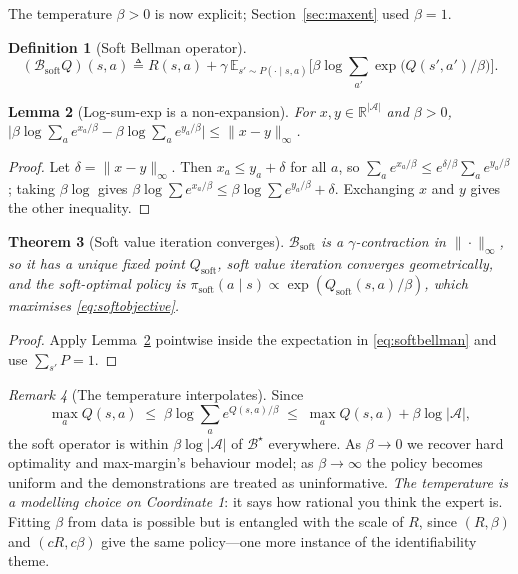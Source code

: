 \documentclass[11pt]{article}
\theoremstyle{plain}
\newtheorem{theorem}{Theorem}[section]
\newtheorem{lemma}[theorem]{Lemma}
\theoremstyle{definition}
\newtheorem{definition}[theorem]{Definition}
\theoremstyle{remark}
\newtheorem{remark}[theorem]{Remark}
\newcommand{\A}{\mathcal{A}}
\newcommand{\E}{\mathbb{E}}
\newcommand{\R}{\mathbb{R}}
\newcommand{\soft}{\mathrm{soft}}
\begin{document}
The temperature $\beta>0$ is now explicit; Section~\ref{sec:maxent} used
$\beta=1$.

\begin{definition}[Soft Bellman operator]
\begin{equation}
(\mathcal{B}_\soft Q)(s,a) \triangleq R(s,a) + \gamma\,\E_{s'\sim P(\cdot\mid
s,a)}\Big[\beta\log\sum_{a'}\exp\big(Q(s',a')/\beta\big)\Big].
\label{eq:softbellman}
\end{equation}
\end{definition}

\begin{lemma}[Log-sum-exp is a non-expansion]\label{lem:lse}
For $x,y\in\R^{|\A|}$ and $\beta>0$, $\big|\beta\log\sum_a e^{x_a/\beta} -
\beta\log\sum_a e^{y_a/\beta}\big| \le \|x-y\|_\infty$.
\end{lemma}

\begin{proof}
Let $\delta=\|x-y\|_\infty$. Then $x_a\le y_a+\delta$ for all $a$, so
$\sum_a e^{x_a/\beta}\le e^{\delta/\beta}\sum_a e^{y_a/\beta}$; taking
$\beta\log$ gives $\beta\log\sum e^{x_a/\beta} \le \beta\log\sum
e^{y_a/\beta} + \delta$. Exchanging $x$ and $y$ gives the other
inequality.
\end{proof}

\begin{theorem}[Soft value iteration converges]
$\mathcal{B}_\soft$ is a $\gamma$-contraction in $\|\cdot\|_\infty$, so it
has a unique fixed point $Q_\soft$, soft value iteration converges
geometrically, and the soft-optimal policy is $\pi_\soft(a\mid s)\propto
\exp(Q_\soft(s,a)/\beta)$, which maximises \eqref{eq:softobjective}.
\end{theorem}

\begin{proof}
Apply Lemma~\ref{lem:lse} pointwise inside the expectation in
\eqref{eq:softbellman} and use $\sum_{s'}P=1$.
\end{proof}

\begin{remark}[The temperature interpolates]
Since
\begin{equation*}
\max_a Q(s,a) \;\le\; \beta\log\sum_a e^{Q(s,a)/\beta} \;\le\; \max_a
Q(s,a) + \beta\log|\A|,
\end{equation*}
the soft operator is within $\beta\log|\A|$ of $\mathcal{B}^\star$
everywhere. As $\beta\to0$ we recover hard optimality and max-margin's
behaviour model; as $\beta\to\infty$ the policy becomes uniform and the
demonstrations are treated as uninformative. \emph{The temperature is a
modelling choice on Coordinate 1}: it says how rational you think the
expert is. Fitting $\beta$ from data is possible but is entangled with the
scale of $R$, since $(R,\beta)$ and $(cR,c\beta)$ give the same
policy---one more instance of the identifiability theme.
\end{remark}
\end{document}
